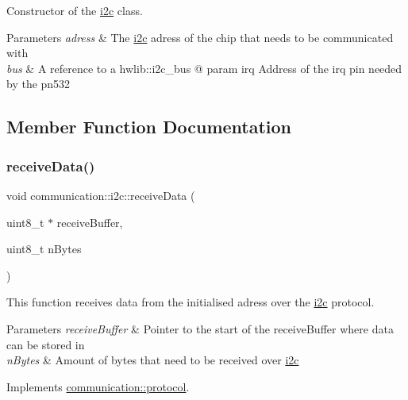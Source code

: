 Constructor of the \hyperlink{classcommunication_1_1i2c}{i2c} class. 


\begin{DoxyParams}{Parameters}
{\em adress} & The \hyperlink{classcommunication_1_1i2c}{i2c} adress of the chip that needs to be communicated with \\
\hline
{\em bus} & A reference to a hwlib\+::i2c\+\_\+bus @ param irq Address of the irq pin needed by the pn532 \\
\hline
\end{DoxyParams}


\subsection{Member Function Documentation}
\mbox{\label{classcommunication_1_1i2c_a112282cf4a6500581c8e252ff2348fea}} 
\subsubsection{\texorpdfstring{receive\+Data()}{receiveData()}}
{\footnotesize\ttfamily void communication\+::i2c\+::receive\+Data (\begin{DoxyParamCaption}\item[{uint8\+\_\+t $\ast$}]{receive\+Buffer,  }\item[{uint8\+\_\+t}]{n\+Bytes }\end{DoxyParamCaption})\hspace{0.3cm}{\ttfamily [virtual]}}



This function receives data from the initialised adress over the \hyperlink{classcommunication_1_1i2c}{i2c} protocol. 


\begin{DoxyParams}{Parameters}
{\em receive\+Buffer} & Pointer to the start of the receive\+Buffer where data can be stored in \\
\hline
{\em n\+Bytes} & Amount of bytes that need to be received over \hyperlink{classcommunication_1_1i2c}{i2c} \\
\hline
\end{DoxyParams}


Implements \hyperlink{classcommunication_1_1protocol_ad0d43530ae3db2b14a6e9c1f77aa530a}{communication\+::protocol}.


